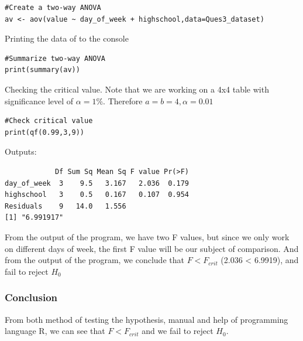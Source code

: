 \documentclass[a4paper]{article}
\numberwithin{equation}{section}
\begin{document}
\begin{mdframed}[leftline=false,rightline=false,backgroundcolor=magenta!10,nobreak=true]
  \begin{verbatim}
#Create a two-way ANOVA
av <- aov(value ~ day_of_week + highschool,data=Ques3_dataset)
  \end{verbatim}
\end{mdframed}

Printing the data of to the console

\begin{mdframed}[leftline=false,rightline=false,backgroundcolor=magenta!10,nobreak=true]
  \begin{verbatim}
#Summarize two-way ANOVA
print(summary(av))
  \end{verbatim}
\end{mdframed}

Checking the critical value. Note that we are working on a 4x4 table with significance level of \(\alpha = 1\% \). Therefore \(a = b = 4, \alpha = 0.01\)

\begin{mdframed}[leftline=false,rightline=false,backgroundcolor=magenta!10,nobreak=true]
  \begin{verbatim}
#Check critical value
print(qf(0.99,3,9))
  \end{verbatim}
\end{mdframed}

Outputs:
\begin{mdframed}[leftline=false,rightline=false,backgroundcolor=teal!10,nobreak=true]
  \begin{verbatim}
            Df Sum Sq Mean Sq F value Pr(>F)
day_of_week  3    9.5   3.167   2.036  0.179
highschool   3    0.5   0.167   0.107  0.954
Residuals    9   14.0   1.556
[1] "6.991917"
  \end{verbatim}
\end{mdframed}

From the output of the program, we have two F values, but since we only work on different days of week, the first F value will be our subject of comparison. And from the output of the program, we conclude that \(F < F_{crit}\) (2.036 < 6.9919), and fail to reject \(H_0\)

\subsubsection{Conclusion}
From both method of testing the hypothesis, manual and help of programming language R, we can see that \(F < F_{crit}\) and we fail to reject \(H_0\).
\end{document}
